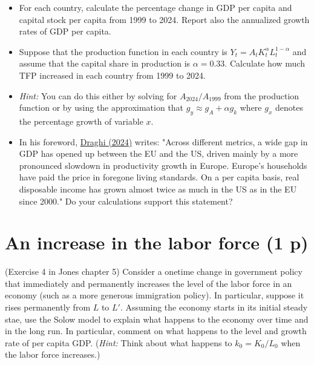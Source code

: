 \documentclass[12pt,a4paper]{article}
\begin{document}
\begin{itemize}
    \item[a.] For each country, calculate the percentage change in GDP per capita and capital stock per capita from 1999 to 2024. Report also the annualized growth rates of GDP per capita.

    \item[b.] Suppose that the production function in each country is $Y_t=A_t K_t^\alpha L_t^{1-\alpha}$ and assume that the capital share in production is $\alpha = 0.33$. Calculate how much TFP increased in each country from 1999 to 2024. 
    
    \item[] \emph{Hint:} You can do this either by solving for $A_{2024}/A_{1999}$ from the production function or by using the approximation that $g_y \approx g_A + \alpha g_k$ where $g_x$ denotes the percentage growth of variable $x$.

    \item[c.] In his foreword, \href{https://commission.europa.eu/document/download/97e481fd-2dc3-412d-be4c-f152a8232961_en?filename=The\%20future\%20of\%20European\%20competitiveness\%20\_\%20A\%20competitiveness\%20strategy\%20for\%20Europe.pdf}{Draghi (2024)} writes: "Across different metrics, a wide gap in GDP has opened up between the EU and the US, driven mainly by a more pronounced slowdown in productivity growth in Europe. Europe’s households have paid the price in foregone living standards. On a per capita basis, real disposable income has grown almost twice as much in the US as in the EU since 2000." Do your calculations support this statement?
\end{itemize}



\section{An increase in the labor force (1 p)}
(Exercise 4 in Jones chapter 5)
Consider a onetime change in government policy that immediately and permanently increases the level of the labor force in an economy (such as a more generous immigration policy). In particular, suppose it rises permanently from $L$ to $L'$. Assuming the economy starts in its initial steady stae, use the Solow model to explain what happens to the economy over time and in the long run. In particular, comment on what happens to the level and growth rate of per capita GDP. (\emph{Hint:} Think about what happens to $k_0=K_0/L_0$ when the labor force increases.) 
\end{document}
